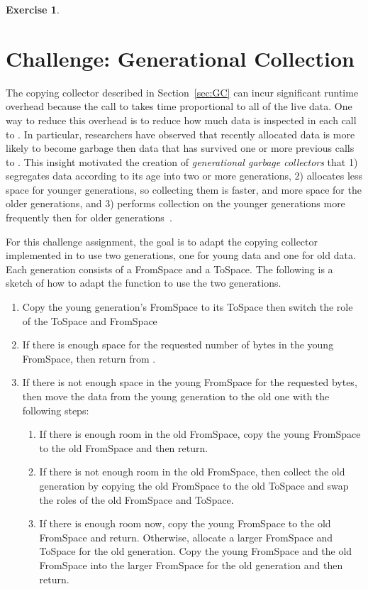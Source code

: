 \documentclass[7x10,nocrop]{TimesAPriori_MIT}%
\newtheorem{exercise}[theorem]{Exercise}
\begin{document}
{\begin{exercise}
\end{exercise}

\section{Challenge: Generational Collection}

The copying collector described in Section~\ref{sec:GC} can incur
significant runtime overhead because the call to  takes
time proportional to all of the live data. One way to reduce this
overhead is to reduce how much data is inspected in each call to
. In particular, researchers have observed that recently
allocated data is more likely to become garbage then data that has
survived one or more previous calls to . This insight
motivated the creation of \emph{generational garbage collectors}
 that
1) segregates data according to its age into two or more generations,
2) allocates less space for younger generations, so collecting them is
faster, and more space for the older generations, and 3) performs
collection on the younger generations more frequently then for older
generations~\citep{Wilson:1992fk}.

For this challenge assignment, the goal is to adapt the copying
collector implemented in  to use two generations, one
for young data and one for old data. Each generation consists of a
FromSpace and a ToSpace. The following is a sketch of how to adapt the
 function to use the two generations.

\begin{enumerate}
\item Copy the young generation's FromSpace to its ToSpace then switch
  the role of the ToSpace and FromSpace
\item If there is enough space for the requested number of bytes in
  the young FromSpace, then return from .
\item If there is not enough space in the young FromSpace for the
  requested bytes, then move the data from the young generation to the
  old one with the following steps:
  \begin{enumerate}
  \item If there is enough room in the old FromSpace, copy the young
    FromSpace to the old FromSpace and then return.
  \item If there is not enough room in the old FromSpace, then collect
    the old generation by copying the old FromSpace to the old ToSpace
    and swap the roles of the old FromSpace and ToSpace.
  \item If there is enough room now, copy the young FromSpace to the
    old FromSpace and return. Otherwise, allocate a larger FromSpace
    and ToSpace for the old generation.  Copy the young FromSpace and
    the old FromSpace into the larger FromSpace for the old
    generation and then return.
  \end{enumerate}
\end{enumerate}

}
\end{document}
